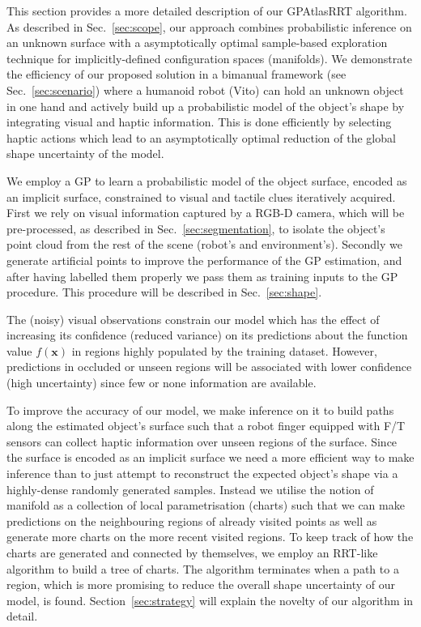 This section provides a more detailed description of our GPAtlasRRT algorithm. As described in Sec.~\ref{sec:scope}, our approach combines probabilistic inference on an unknown surface with a asymptotically optimal sample-based exploration technique for implicitly-defined configuration spaces (manifolds). We demonstrate the efficiency of our proposed solution in a bimanual framework (see Sec.~\ref{sec:scenario}) where a humanoid robot (Vito) can hold an unknown object in one hand and actively build up a probabilistic model of the object's shape by integrating visual and haptic information. This is done efficiently by selecting haptic actions which lead to an asymptotically optimal reduction of the global shape uncertainty of the model. 

We employ a GP to learn a probabilistic model of the object surface, encoded as an implicit surface, constrained to visual and tactile clues iteratively acquired. First we rely on visual information captured by a RGB-D camera, which will be pre-processed, as described in Sec.~\ref{sec:segmentation}, to isolate the object's point cloud from the rest of the scene (robot's and environment's). Secondly we generate artificial points to improve the performance of the GP estimation, and after having labelled them properly we pass them as training inputs to the GP procedure. This procedure will be described in Sec.~\ref{sec:shape}. 

The (noisy) visual observations constrain our model which has the effect of increasing its confidence (reduced variance) on its predictions about the function value $f(\mathbf{x})$ in regions highly populated by the training dataset. However, predictions in occluded or unseen regions will be associated with lower confidence (high uncertainty) since few or none information are available.  

To improve the accuracy of our model, we make inference on it to build paths along the estimated object's surface such that a robot finger equipped with F/T sensors can collect haptic information over unseen regions of the surface. Since the surface is encoded as an implicit surface we need a more efficient way to make inference than to just attempt to reconstruct the expected object's shape via a highly-dense randomly generated samples. Instead we utilise the notion of manifold as a collection of local parametrisation (charts) such that we can make predictions on the neighbouring regions of already visited points as well as generate more charts on the more recent visited regions. To keep track of how the charts are generated and connected by themselves, we employ an RRT-like algorithm to build a tree of charts. The algorithm terminates when a path to a region, which is more promising to reduce the overall shape uncertainty of our model, is found.
Section~\ref{sec:strategy} will explain the novelty of our algorithm in detail.  

